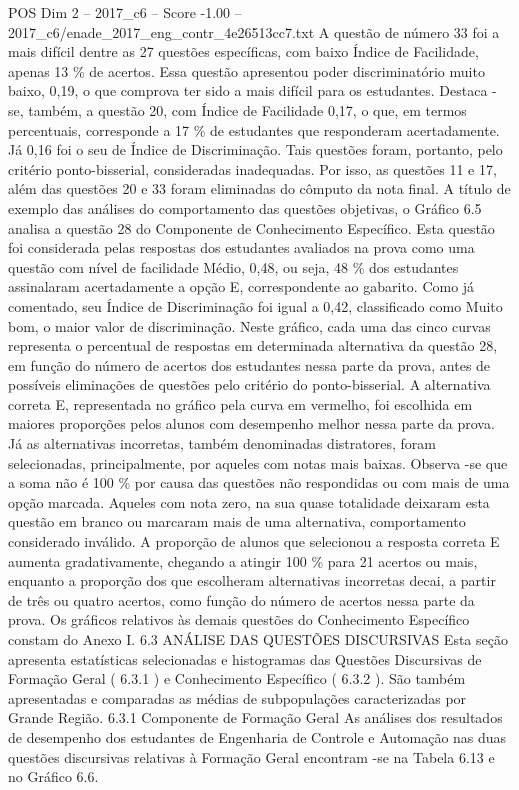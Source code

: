 \begin{textsample}{POS Dim 2 – 2017\_c6 – Score -1.00 – 2017\_c6/enade\_2017\_eng\_contr\_4e26513cc7.txt}
A questão de número 33 foi a mais difícil dentre as 27 questões específicas, com baixo Índice de Facilidade, apenas 13 \% de acertos.
Essa questão apresentou poder discriminatório muito baixo, 0,19, o que comprova ter sido a mais difícil para os estudantes.
Destaca -se, também, a questão 20, com Índice de Facilidade 0,17, o que, em termos percentuais, corresponde a 17 \% de estudantes que responderam acertadamente.
Já 0,16 foi o seu de Índice de Discriminação.
Tais questões foram, portanto, pelo critério ponto-bisserial, consideradas inadequadas.
Por isso, as questões 11 e 17, além das questões 20 e 33 foram eliminadas do cômputo da nota final.
A título de exemplo das análises do comportamento das questões objetivas, o Gráfico 6.5 analisa a questão 28 do Componente de Conhecimento Específico.
Esta questão foi considerada pelas respostas dos estudantes avaliados na prova como uma questão com nível de facilidade Médio, 0,48, ou seja, 48 \% dos estudantes assinalaram acertadamente a opção E, correspondente ao gabarito.
Como já comentado, seu Índice de Discriminação foi igual a 0,42, classificado como Muito bom, o maior valor de discriminação.
Neste gráfico, cada uma das cinco curvas representa o percentual de respostas em determinada alternativa da questão 28, em função do número de acertos dos estudantes nessa parte da prova, antes de possíveis eliminações de questões pelo critério do ponto-bisserial.
A alternativa correta E, representada no gráfico pela curva em vermelho, foi escolhida em maiores proporções pelos alunos com desempenho melhor nessa parte da prova.
Já as alternativas incorretas, também denominadas distratores, foram selecionadas, principalmente, por aqueles com notas mais baixas.
Observa -se que a soma não é 100 \% por causa das questões não respondidas ou com mais de uma opção marcada.
Aqueles com nota zero, na sua quase totalidade deixaram esta questão em branco ou marcaram mais de uma alternativa, comportamento considerado inválido.
A proporção de alunos que selecionou a resposta correta E aumenta gradativamente, chegando a atingir 100 \% para 21 acertos ou mais, enquanto a proporção dos que escolheram alternativas incorretas decai, a partir de três ou quatro acertos, como função do número de acertos nessa parte da prova.
Os gráficos relativos às demais questões do Conhecimento Específico constam do Anexo I. 6.3 ANÁLISE DAS QUESTÕES DISCURSIVAS Esta seção apresenta estatísticas selecionadas e histogramas das Questões Discursivas de Formação Geral ( 6.3.1 ) e Conhecimento Específico ( 6.3.2 ).
São também apresentadas e comparadas as médias de subpopulações caracterizadas por Grande Região. 6.3.1 Componente de Formação Geral As análises dos resultados de desempenho dos estudantes de Engenharia de Controle e Automação nas duas questões discursivas relativas à Formação Geral encontram -se na Tabela 6.13 e no Gráfico 6.6.

\end{textsample}
